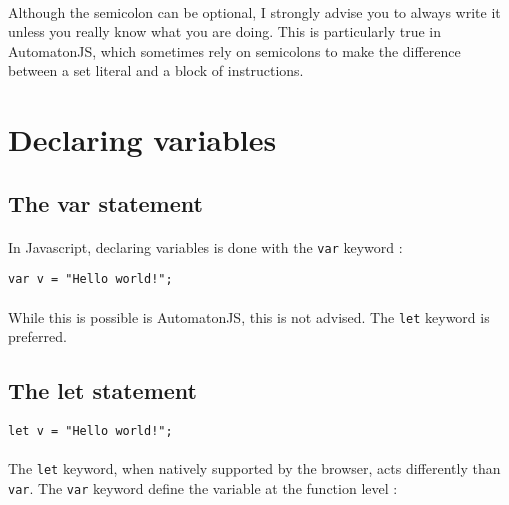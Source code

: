 \documentclass{article}
\begin{document}
\begin{sloppypar}
   
\paragraph{}
Although the semicolon can be optional, I strongly advise you to always write it unless you really know what you are doing. This is particularly true in AutomatonJS, which sometimes rely on semicolons to make the difference between a set literal and a block of instructions.




\section{ Declaring variables}



\subsection{ The var statement}


\paragraph{}
In Javascript, declaring variables is done with the \lstinline!var! keyword :
{\begin{lstlisting}
var v = "Hello world!";
\end{lstlisting}
}


      
\paragraph{}
While this is possible is AutomatonJS, this is not advised. The \lstinline!let! keyword is preferred.
   
   

\subsection{ The let statement}

{\begin{lstlisting}
let v = "Hello world!";
\end{lstlisting}
}


      
\paragraph{}
The \lstinline!let! keyword, when natively supported by the browser, acts differently than \lstinline!var!. The \lstinline!var! keyword define the variable at the function level :
      

\end{sloppypar}
\end{document}
